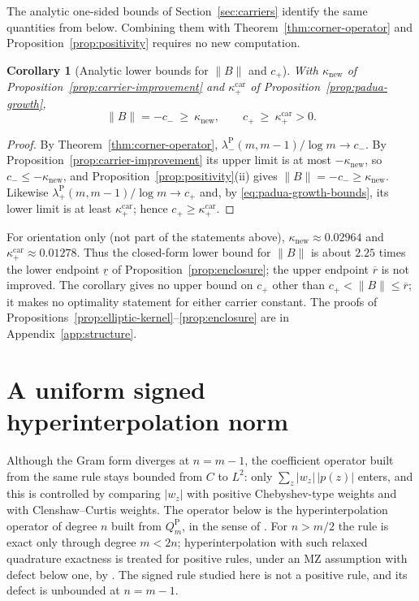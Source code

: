 \documentclass[preprint,12pt,a4paper]{elsarticle}
\newtheorem{corollary}[theorem]{Corollary}
\theoremstyle{remark}
\newcommand{\Pa}{\mathrm P}
\begin{document}
The analytic one-sided bounds of Section~\ref{sec:carriers} identify the same
quantities from below. Combining them with Theorem~\ref{thm:corner-operator}
and Proposition~\ref{prop:positivity} requires no new computation.

\begin{corollary}[Analytic lower bounds for $\|B\|$ and $c_+$]\label{cor:norm-lower}
With $\kappa_{\mathrm{new}}$ of Proposition~\ref{prop:carrier-improvement} and
$\kappa^{\mathrm{car}}_+$ of Proposition~\ref{prop:padua-growth},
\[
 \|B\|=-c_-\ \ge\ \kappa_{\mathrm{new}},\qquad
 c_+\ \ge\ \kappa^{\mathrm{car}}_+>0 .
\]
\end{corollary}
\begin{proof}
By Theorem~\ref{thm:corner-operator}, $\lambda^\Pa_-(m,m-1)/\log m\to c_-$.
By Proposition~\ref{prop:carrier-improvement} its upper limit is at most
$-\kappa_{\mathrm{new}}$, so $c_-\le-\kappa_{\mathrm{new}}$, and
Proposition~\ref{prop:positivity}(ii) gives $\|B\|=-c_-\ge\kappa_{\mathrm{new}}$.
Likewise $\lambda^\Pa_+(m,m-1)/\log m\to c_+$ and, by
\eqref{eq:padua-growth-bounds}, its lower limit is at least
$\kappa^{\mathrm{car}}_+$; hence $c_+\ge\kappa^{\mathrm{car}}_+$.
\end{proof}

For orientation only (not part of the statements above),
$\kappa_{\mathrm{new}}\approx0.02964$ and $\kappa^{\mathrm{car}}_+\approx0.01278$.
Thus the closed-form lower bound for $\|B\|$ is about $2.25$ times the lower
endpoint $\underline r$ of Proposition~\ref{prop:enclosure}; the upper endpoint
$\overline r$ is not improved. The corollary gives no upper bound on $c_+$ other
than $c_+<\|B\|\le\overline r$; it makes no optimality statement for either
carrier constant.
The proofs of Propositions~\ref{prop:elliptic-kernel}--\ref{prop:enclosure}
are in Appendix~\ref{app:structure}.

\section{A uniform signed hyperinterpolation norm}\label{sec:uniform-norm}

Although the Gram form diverges at $n=m-1$, the coefficient operator built from
the same rule stays bounded from $C$ to $L^2$: only $\sum_z|w_z|\,|p(z)|$ enters,
and this is controlled by comparing $|w_z|$ with positive Chebyshev-type weights
and with Clenshaw--Curtis weights. The operator below is the hyperinterpolation
operator of degree $n$ built from $Q_m^\Pa$, in the sense of \citet{CDMV07}. For
$n>m/2$ the rule is exact only through degree $m<2n$; hyperinterpolation with
such relaxed quadrature exactness is treated for positive rules, under an MZ
assumption with defect below one, by \citet{AW22}. The signed rule studied here
is not a positive rule, and its defect is unbounded at $n=m-1$.
\end{document}
